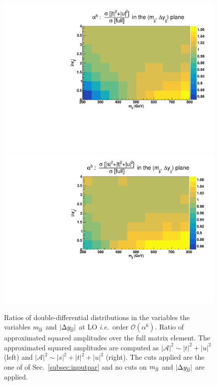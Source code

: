 \begin{figure}[hbt]
\centering
\includegraphics[scale=0.395]{figures/scanfigures/ratio_tu.pdf}
\includegraphics[scale=0.395]{figures/scanfigures/ratio_stu.pdf}
\caption{Ratios of double-differential distributions in the variables the variables $m_{\text{j}\text{j}}$ and $|\Delta y_{\text{j}\text{j}}|$ at LO \emph{i.e.}\ order $\mathcal{O}(\alpha^6)$.
Ratio of approximated squared amplitudes over the full matrix element.
The approximated squared amplitudes are computed as $|\mathcal{A}|^2 \sim |t|^2 + |u|^2$ (left) and $|\mathcal{A}|^2 \sim |s|^2 + |t|^2 + |u|^2$ (right).
The cuts applied are the one of of Sec.~\ref{subsec:inputpar} and no cuts on $m_{\text{j}\text{j}}$ and $|\Delta y_{\text{j}\text{j}}|$ are applied.} 
\label{fig:ratio2d_LO}
\end{figure}

